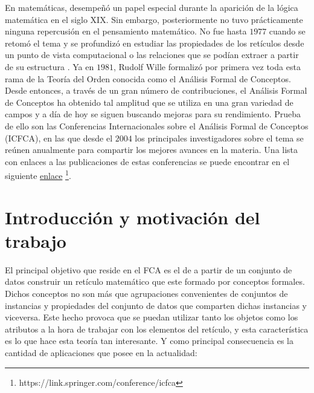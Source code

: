 \documentclass[oneside,openright,titlepage,numbers=noenddot,openany,headinclude,footinclude=true,
cleardoublepage=empty,abstractoff,BCOR=5mm,paper=a4,fontsize=12pt,main=spanish]{scrreprt}
\begin{document}
En matemáticas, desempeñó un papel especial durante la aparición de la lógica matemática en el siglo XIX. Sin embargo, posteriormente no tuvo prácticamente ninguna repercusión en el pensamiento matemático. No fue hasta $1977$ cuando se retomó el tema y se profundizó en estudiar las propiedades de los retículos desde un punto de vista computacional \cite{distributive} o las relaciones que se podían extraer a partir de su estructura \cite{tolerance}. Ya en $1981$, Rudolf Wille \cite{willeconcept} formalizó por primera vez toda esta rama de la Teoría del Orden conocida como el Análisis Formal de Conceptos. Desde entonces, a través de un gran número de contribuciones, el Análisis Formal de Conceptos ha obtenido tal amplitud que se utiliza en una gran variedad de campos y a día de hoy se siguen buscando mejoras para su rendimiento. Prueba de ello son las Conferencias Internacionales sobre el Análisis Formal de Conceptos (ICFCA), en las que desde el $2004$ los principales investigadores sobre el tema se reúnen anualmente para compartir los mejores avances en la materia. Una lista con enlaces a las publicaciones de estas conferencias se puede encontrar en el siguiente \href{https://link.springer.com/conference/icfca}{enlace} \footnote{https://link.springer.com/conference/icfca}.

\section{Introducción y motivación del trabajo}

El principal objetivo que reside en el FCA es el de a partir de un conjunto de datos construir un retículo matemático que este formado por conceptos formales. Dichos conceptos no son más que agrupaciones convenientes de conjuntos de instancias y propiedades del conjunto de datos que comparten dichas instancias y viceversa. Este hecho provoca que se puedan utilizar tanto los objetos como los atributos a la hora de trabajar con los elementos del retículo, y esta característica es lo que hace esta teoría tan interesante.  Y como principal consecuencia es la cantidad de aplicaciones que posee en la actualidad:
\end{document}
